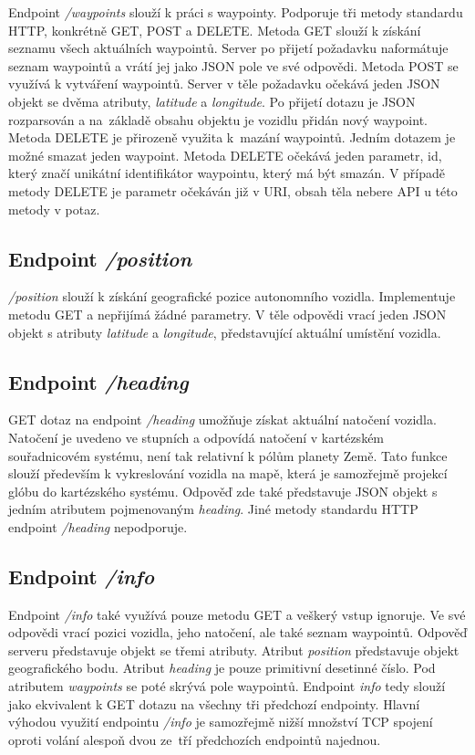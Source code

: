 \documentclass[czech, bachelor]{diploma}
\begin{document}
Endpoint \emph{/waypoints} slouží k práci s waypointy. Podporuje tři metody standardu HTTP\cite{http-source}, konkrétně GET, POST
a DELETE.  Metoda GET slouží k získání seznamu všech aktuálních waypointů. Server po přijetí požadavku naformátuje seznam
waypointů a vrátí jej jako JSON pole ve své odpovědi. Metoda POST se využívá k vytváření waypointů. Server v těle požadavku
očekává jeden JSON objekt se dvěma atributy, \emph{latitude} a \emph{longitude}. Po přijetí dotazu je JSON rozparsován a
na~základě obsahu objektu je vozidlu přidán nový waypoint. Metoda DELETE je přirozeně využita k~mazání waypointů. Jedním dotazem
je možné smazat jeden waypoint. Metoda DELETE očekává jeden parametr, id, který značí unikátní identifikátor waypointu, který má
být smazán. V případě metody DELETE je parametr očekáván již v URI, obsah těla nebere API u této metody v potaz.

\subsection{Endpoint \emph{/position}}

\emph{/position} slouží k získání geografické pozice autonomního vozidla. Implementuje metodu GET a nepřijímá žádné parametry.
V těle odpovědi vrací jeden JSON objekt s atributy \emph{latitude} a \emph{longitude}, představující aktuální umístění vozidla.

\subsection{Endpoint \emph{/heading}}

GET dotaz na endpoint \emph{/heading} umožňuje získat aktuální natočení vozidla. Natočení je uvedeno ve stupních a odpovídá
natočení v kartézském souřadnicovém systému, není tak relativní k pólům planety Země. Tato funkce slouží především k vykreslování
vozidla na mapě, která je samozřejmě projekcí glóbu do kartézského systému. Odpověď zde také představuje JSON objekt s jedním
atributem pojmenovaným \emph{heading}. Jiné metody standardu HTTP endpoint \emph{/heading} nepodporuje.

\subsection{Endpoint \emph{/info}}

Endpoint \emph{/info} také využívá pouze metodu GET a veškerý vstup ignoruje. Ve své odpovědi vrací pozici vozidla, jeho
natočení, ale také seznam waypointů.  Odpověď serveru představuje objekt se třemi atributy. Atribut \emph{position} představuje
objekt geografického bodu. Atribut \emph{heading} je pouze primitivní desetinné číslo. Pod atributem \emph{waypoints} se poté
skrývá pole waypointů. Endpoint \emph{info} tedy slouží jako ekvivalent k GET dotazu na všechny tři předchozí endpointy. Hlavní
výhodou využití endpointu \emph{/info} je samozřejmě nižší množství TCP spojení oproti volání alespoň dvou ze~tří předchozích
endpointů najednou.
\end{document}
